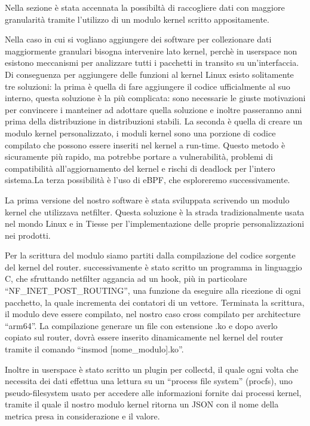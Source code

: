 Nella sezione \cite{chapter:our_work} è stata accennata la possibiltà di raccogliere dati con maggiore granularità tramite l'utilizzo di un modulo kernel scritto appositamente.

Nella caso in cui si vogliano aggiungere dei software per collezionare dati maggiormente granulari bisogna intervenire lato kernel, perchè in userspace non esistono meccanismi per analizzare tutti i pacchetti in transito su un'interfaccia. Di conseguenza per aggiungere delle funzioni al kernel Linux esisto solitamente tre soluzioni: la prima è quella di fare aggiungere il codice ufficialmente al suo interno, questa soluzione è la più complicata: sono necessarie le giuste motivazioni per convincere i manteiner ad adottare quella soluzione e inoltre passeranno anni prima della distribuzione in distribuzioni stabili. La seconda è quella di creare un modulo kernel personalizzato, i moduli kernel sono una porzione di codice compilato che possono essere inseriti nel kernel a run-time. Questo metodo è sicuramente più rapido, ma potrebbe portare a vulnerabilità, problemi di compatibilità all'aggiornamento del kernel e rischi di deadlock per l'intero sistema.La terza possibilità è l'uso di eBPF, che esploreremo successivamente.

La prima versione del nostro software è stata sviluppata scrivendo un modulo kernel che utilizzava netfilter. Questa soluzione è la strada tradizionalmente usata nel mondo Linux e in Tiesse per l'implementazione delle proprie personalizzazioni nei prodotti.

Per la scrittura del modulo siamo partiti dalla compilazione del codice sorgente del kernel del router. successivamente è stato scritto un programma in linguaggio C, che sfruttando netfilter aggancia ad un hook, più in particolare ``NF\_INET\_POST\_ROUTING'', una funzione da eseguire alla ricezione di ogni pacchetto, la quale incrementa dei contatori di un vettore.
Terminata la scrittura, il modulo deve essere compilato, nel nostro caso cross compilato per architecture ``arm64''. La compilazione generare un file con estensione .ko e dopo averlo copiato sul router, dovrà essere inserito dinamicamente nel kernel del router tramite il comando ``insmod [nome\_modulo].ko''.

Inoltre in userspace è stato scritto un plugin per collectd, il quale ogni volta che necessita dei dati effettua una lettura su un ``process file system'' (procfs), uno pseudo-filesystem usato per accedere alle informazioni fornite dai processi kernel, tramite il quale il nostro modulo kernel ritorna un JSON con il nome della metrica presa in considerazione e il valore.

